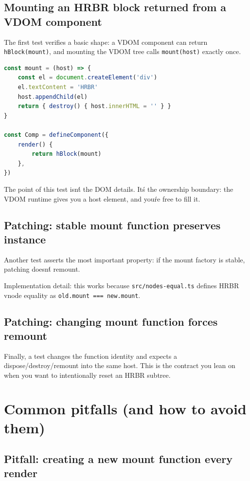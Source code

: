 \subsection{Mounting an HRBR block returned from a VDOM component}

The first test verifies a basic shape: a VDOM component can return \texttt{hBlock(mount)}, and mounting the VDOM tree calls \texttt{mount(host)} exactly once.

\begin{lstlisting}[language=JavaScript]
const mount = (host) => {
	const el = document.createElement('div')
	el.textContent = 'HRBR'
	host.appendChild(el)
	return { destroy() { host.innerHTML = '' } }
}

const Comp = defineComponent({
	render() {
		return hBlock(mount)
	},
})
\end{lstlisting}

The point of this test isn\'t the DOM details.
It\'s the ownership boundary: the VDOM runtime gives you a host element, and you\'re free to fill it.

\subsection{Patching: stable mount function preserves instance}

Another test asserts the most important property: if the mount factory is stable, patching doesn\'t remount.

Implementation detail: this works because \texttt{src/nodes-equal.ts} defines HRBR vnode equality as \texttt{old.mount === new.mount}.

\subsection{Patching: changing mount function forces remount}

Finally, a test changes the function identity and expects a dispose/destroy/remount into the same host.
This is the contract you lean on when you want to intentionally reset an HRBR subtree.

\section{Common pitfalls (and how to avoid them)}

\subsection{Pitfall: creating a new mount function every render}

